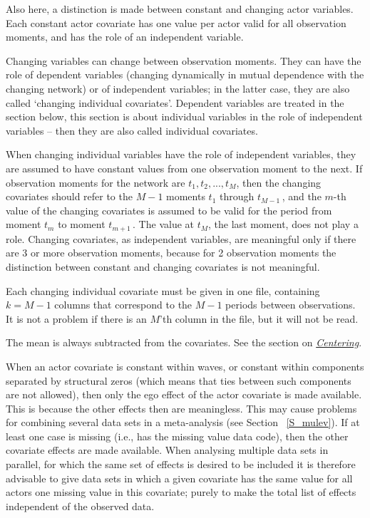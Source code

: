 \documentclass[a4paper,fleqn]{article}
\newcommand{\+}{\, + \,}
\begin{document}
{Also here, a distinction is made between constant and changing actor
variables. Each constant actor covariate has one value per actor
valid for all observation moments, and has the role of an
independent variable.

Changing variables can change between observation moments. They
can have the role of dependent variables (changing dynamically in
mutual dependence with the changing network) or of independent
variables; in the latter case, they are also called `changing
individual covariates'. Dependent variables are treated in the
section below, this section is about individual variables
in the role of independent variables -- then they are also
called individual covariates.

When changing individual variables have the role of
independent variables, they are assumed to have constant values from one
observation moment to the next. If observation moments for the
network are $t_1, t_2, ..., t_M$, then the changing covariates
should refer to the $M-1$ moments $t_1$ through $t_{M-1}\,$, and
the $m$-th value of the changing covariates is assumed to be valid
for the period from moment $t_m$ to moment $t_{m+1}\,$.
The value at $t_M$, the last moment, does not play a role.
Changing covariates, as independent variables, are meaningful
only if there are 3 or more observation moments,
because for 2 observation moments the distinction between
constant and changing covariates is not meaningful.

Each changing individual covariate must be given in one file,
containing $k = M-1$ columns that correspond to the $M-1$ periods
between observations.
It is not a problem if there is an $M$'th column in the file,
but it will not be read.

The mean is always subtracted from the covariates.
See the section on \hyperlink{T_S_centering}{\emph{Centering}}.

When an actor covariate is constant within waves, or constant
within components separated by structural zeros (which means that
ties between such components are not allowed), then only the ego effect
of the actor covariate is made available.
This is because the other effects then are meaningless.
This may cause problems for combining several data sets
in a meta-analysis (see Section ~\ref{S_mulev}).
If at least one case is missing (i.e., has the missing value data code),
then the other covariate effects are made available.
When analysing multiple data sets in parallel,
for which the same set of effects is desired to be included %
it is therefore advisable to give data sets in which
a given covariate has the same value for all actors
one missing value in this covariate;
purely to make
the total list of effects %
independent of the observed data.


}
\end{document}
